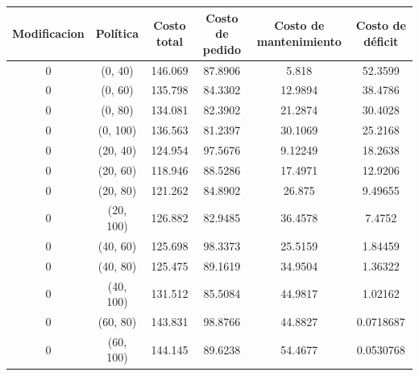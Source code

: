 \documentclass[12pt, spanish]{article}
\begin{document}
\begin{table}[H]
\begin{tabular}{|c|c|c|c|c|c|}
\hline
\textbf{Modificacion} & \textbf{Política} & \textbf{Costo total} & \textbf{Costo de pedido} & \textbf{Costo de mantenimiento} & \textbf{Costo de déficit} \\ \hline
0                     & (0, 40)           & 146.069              & 87.8906                  & 5.818                           & 52.3599                   \\ \hline
0                     & (0, 60)           & 135.798              & 84.3302                  & 12.9894                         & 38.4786                   \\ \hline
0                     & (0, 80)           & 134.081              & 82.3902                  & 21.2874                         & 30.4028                   \\ \hline
0                     & (0, 100)          & 136.563              & 81.2397                  & 30.1069                         & 25.2168                   \\ \hline
0                     & (20, 40)          & 124.954              & 97.5676                  & 9.12249                         & 18.2638                   \\ \hline
0                     & (20, 60)          & 118.946              & 88.5286                  & 17.4971                         & 12.9206                   \\ \hline
0                     & (20, 80)          & 121.262              & 84.8902                  & 26.875                          & 9.49655                   \\ \hline
0                     & (20, 100)         & 126.882              & 82.9485                  & 36.4578                         & 7.4752                    \\ \hline
0                     & (40, 60)          & 125.698              & 98.3373                  & 25.5159                         & 1.84459                   \\ \hline
0                     & (40, 80)          & 125.475              & 89.1619                  & 34.9504                         & 1.36322                   \\ \hline
0                     & (40, 100)         & 131.512              & 85.5084                  & 44.9817                         & 1.02162                   \\ \hline
0                     & (60, 80)          & 143.831              & 98.8766                  & 44.8827                         & 0.0718687                 \\ \hline
0                     & (60, 100)         & 144.145              & 89.6238                  & 54.4677                         & 0.0530768                 \\ \hline
\end{tabular}
\end{table}
\end{document}
